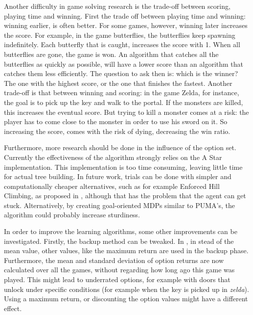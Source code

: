 Another difficulty in game solving research is the trade-off between scoring,
playing time and winning. First the trade off between playing time and winning:
winning earlier, is often better. For some games, however, winning later
increases the score. For example, in the game butterflies, the butterflies keep
spawning indefinitely. Each butterfly that is caught, increases the score with
1. When all butterflies are gone, the game is won. An algorithm that catches all
the butterflies as quickly as possible, will have a lower score than an
algorithm that catches them less efficiently. The question to ask then is: which
is the winner? The one with the highest score, or the one that finishes the
fastest. Another trade-off is that between winning and scoring: in the game
Zelda, for instance, the goal is to pick up the key and walk to the portal. If
the monsters are killed, this increases the eventual score. But trying to kill a
monster comes at a risk: the player has to come close to the monster in order to
use his sword on it. So increasing the score, comes with the risk of dying,
decreasing the win ratio.



Furthermore, more research should be done in the influence of the option set.
Currently the effectiveness of the algorithm strongly relies on the A Star
implementation. This implementation is too time consuming, leaving
little time for actual tree building. In future work, trials can be done with
simpler and computationally cheaper alternatives, such as for example Enforced
Hill Climbing, as proposed in \cite{ross2014general}, although that has the
problem that the agent can get stuck. Alternatively, by creating goal-oriented
MDPs similar to PUMA's, the algorithm could probably increase sturdiness.


In order to improve the learning algorithms, some other improvements can be
investigated. Firstly, the backup method can be tweaked. In
\cite{coulom2007efficient}, in stead of the mean value, other values, like the
maximum return are used in the backup phase. Furthermore, the mean and standard
deviation of option returns are now calculated over all the games, without
regarding how long ago this game was played. This might lead to underrated
options, for example with doors that unlock under specific conditions (for
example when the key is picked up in \textit{zelda}).  Using a maximum return,
or discounting the option values might have a different effect.

